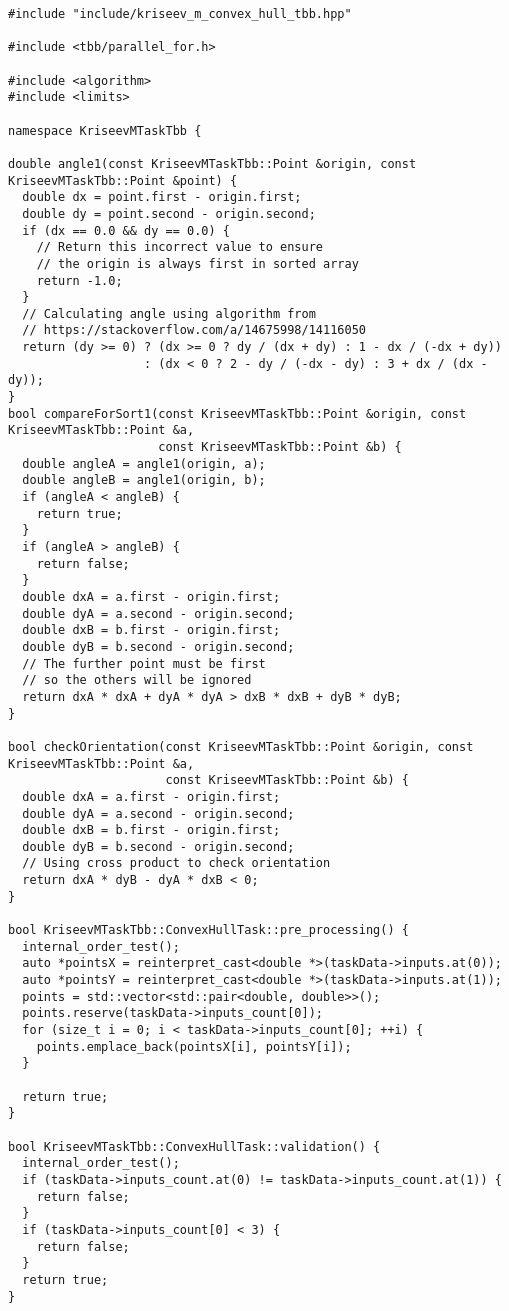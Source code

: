 \documentclass[a4paper,12pt]{article}
\begin{document}
\begin{lstlisting}
#include "include/kriseev_m_convex_hull_tbb.hpp"

#include <tbb/parallel_for.h>

#include <algorithm>
#include <limits>

namespace KriseevMTaskTbb {

double angle1(const KriseevMTaskTbb::Point &origin, const KriseevMTaskTbb::Point &point) {
  double dx = point.first - origin.first;
  double dy = point.second - origin.second;
  if (dx == 0.0 && dy == 0.0) {
    // Return this incorrect value to ensure 
    // the origin is always first in sorted array
    return -1.0;
  }
  // Calculating angle using algorithm from 
  // https://stackoverflow.com/a/14675998/14116050
  return (dy >= 0) ? (dx >= 0 ? dy / (dx + dy) : 1 - dx / (-dx + dy))
                   : (dx < 0 ? 2 - dy / (-dx - dy) : 3 + dx / (dx - dy));
}
bool compareForSort1(const KriseevMTaskTbb::Point &origin, const KriseevMTaskTbb::Point &a,
                     const KriseevMTaskTbb::Point &b) {
  double angleA = angle1(origin, a);
  double angleB = angle1(origin, b);
  if (angleA < angleB) {
    return true;
  }
  if (angleA > angleB) {
    return false;
  }
  double dxA = a.first - origin.first;
  double dyA = a.second - origin.second;
  double dxB = b.first - origin.first;
  double dyB = b.second - origin.second;
  // The further point must be first
  // so the others will be ignored
  return dxA * dxA + dyA * dyA > dxB * dxB + dyB * dyB;
}

bool checkOrientation(const KriseevMTaskTbb::Point &origin, const KriseevMTaskTbb::Point &a,
                      const KriseevMTaskTbb::Point &b) {
  double dxA = a.first - origin.first;
  double dyA = a.second - origin.second;
  double dxB = b.first - origin.first;
  double dyB = b.second - origin.second;
  // Using cross product to check orientation
  return dxA * dyB - dyA * dxB < 0;
}

bool KriseevMTaskTbb::ConvexHullTask::pre_processing() {
  internal_order_test();
  auto *pointsX = reinterpret_cast<double *>(taskData->inputs.at(0));
  auto *pointsY = reinterpret_cast<double *>(taskData->inputs.at(1));
  points = std::vector<std::pair<double, double>>();
  points.reserve(taskData->inputs_count[0]);
  for (size_t i = 0; i < taskData->inputs_count[0]; ++i) {
    points.emplace_back(pointsX[i], pointsY[i]);
  }

  return true;
}

bool KriseevMTaskTbb::ConvexHullTask::validation() {
  internal_order_test();
  if (taskData->inputs_count.at(0) != taskData->inputs_count.at(1)) {
    return false;
  }
  if (taskData->inputs_count[0] < 3) {
    return false;
  }
  return true;
}


\end{lstlisting}
\end{document}
